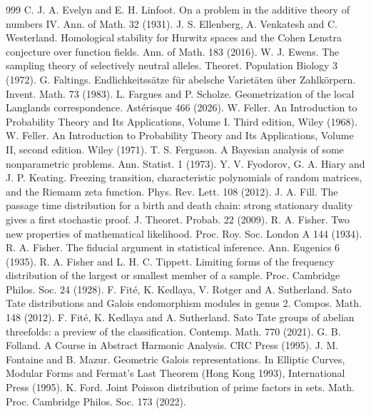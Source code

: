 \begin{thebibliography}{999}
 C. J. A. Evelyn and E. H. Linfoot. On a problem in the additive theory of numbers IV. Ann. of Math. 32 (1931).
 J. S. Ellenberg, A. Venkatesh and C. Westerland. Homological stability for Hurwitz spaces and the Cohen Lenstra conjecture over function fields. Ann. of Math. 183 (2016).
 W. J. Ewens. The sampling theory of selectively neutral alleles. Theoret. Population Biology 3 (1972).
 G. Faltings. Endlichkeitss\"atze f\"ur abelsche Variet\"aten \"uber Zahlk\"orpern. Invent. Math. 73 (1983).
 L. Fargues and P. Scholze. Geometrization of the local Langlands correspondence. Ast\'erisque 466 (2026).
 W. Feller. An Introduction to Probability Theory and Its Applications, Volume I. Third edition, Wiley (1968).
 W. Feller. An Introduction to Probability Theory and Its Applications, Volume II, second edition. Wiley (1971).
 T. S. Ferguson. A Bayesian analysis of some nonparametric problems. Ann. Statist. 1 (1973).
 Y. V. Fyodorov, G. A. Hiary and J. P. Keating. Freezing transition, characteristic polynomials of random matrices, and the Riemann zeta function. Phys. Rev. Lett. 108 (2012).
 J. A. Fill. The passage time distribution for a birth and death chain: strong stationary duality gives a first stochastic proof. J. Theoret. Probab. 22 (2009).
 R. A. Fisher. Two new properties of mathematical likelihood. Proc. Roy. Soc. London A 144 (1934).
 R. A. Fisher. The fiducial argument in statistical inference. Ann. Eugenics 6 (1935).
 R. A. Fisher and L. H. C. Tippett. Limiting forms of the frequency distribution of the largest or smallest member of a sample. Proc. Cambridge Philos. Soc. 24 (1928).
 F. Fit\'e, K. Kedlaya, V. Rotger and A. Sutherland. Sato Tate distributions and Galois endomorphism modules in genus 2. Compos. Math. 148 (2012).
 F. Fit\'e, K. Kedlaya and A. Sutherland. Sato Tate groups of abelian threefolds: a preview of the classification. Contemp. Math. 770 (2021).
 G. B. Folland. A Course in Abstract Harmonic Analysis. CRC Press (1995).
 J. M. Fontaine and B. Mazur. Geometric Galois representations. In Elliptic Curves, Modular Forms and Fermat's Last Theorem (Hong Kong 1993), International Press (1995).
 K. Ford. Joint Poisson distribution of prime factors in sets. Math. Proc. Cambridge Philos. Soc. 173 (2022).

\end{thebibliography}
